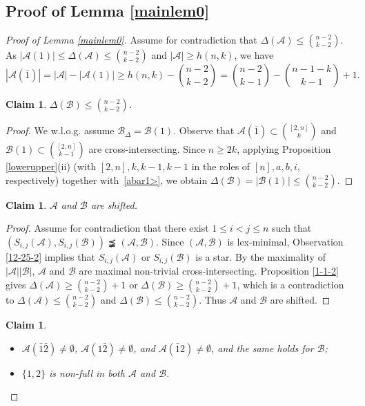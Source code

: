 \documentclass[a4paper,11pt]{article}
\newtheorem{claim}[theorem]{Claim}
\newcommand{\m}{\mathcal}
\begin{document}
\subsection{Proof of Lemma \ref{mainlem0}}
\begin{proof}[Proof of Lemma \ref{mainlem0}]
Assume for contradiction that $\Delta(\mathcal{A})\le {n-2\choose k-2}$. 
As $|\m A(1)|\le \Delta(\m A)\le {n-2\choose k-2}$ and $|\m A|\ge h(n,k)$, 
we have 
\begin{equation}\label{abar1>}
    |\m A(\bar{1})|=|\m A|-|\m A(1)|\ge h(n,k)-{n-2\choose k-2}= {n-2\choose k-1}-{n-1-k\choose k-1}+1.
\end{equation}

\begin{claim}
    $\Delta(\m B)\le {n-2\choose k-2}$.
\end{claim}

\begin{proof}
We w.l.o.g. assume $\m B_{\Delta}=\m B(1)$. 
Observe that $\m A(\bar{1})\subset {[2,n]\choose k}$ and $\m B(1)\subset {[2,n]\choose k-1}$ are cross-intersecting. Since $n\ge 2k$, 
applying Proposition \ref{lowerupper}(ii) (with $[2,n], k, k-1, k-1$ in the roles of $[n], a, b, i$, respectively) together with~\eqref{abar1>}, we obtain 
$\Delta(\m B)=|\m B(1)|\le {n-2\choose k-2}.$ 
\end{proof}

\begin{claim}\label{abshifted}
    $\mathcal{A}$ and $\mathcal{B}$ are shifted.
\end{claim}

\begin{proof}
Assume for contradiction that there exist $1\le i <j \le n$ such that $(S_{i,j}(\mathcal{A}), S_{i,j}(\mathcal{B}))\precneqq(\mathcal{A}, \mathcal{B})$. 
Since $(\m A, \m B)$ is lex-minimal, Observation \ref{12-25-2} implies that $S_{i,j}(\mathcal{A})$ or $S_{i,j}(\mathcal{B})$ is a star. 
By the maximality of $|\m A||\m B|$, $\m A$ and $\m B$ are maximal non-trivial cross-intersecting. 
 Proposition \ref{1-1-2} gives  
$\Delta(\mathcal{A})\ge {n-2\choose k-2}+1$ or $\Delta(\m B)\ge {n-2\choose k-2}+1$, which is a contradiction to $\Delta(\mathcal{A})\le {n-2\choose k-2}$ and $\Delta(\m B)\le {n-2\choose k-2}$. Thus $\mathcal{A}$ and $\mathcal{B}$ are shifted.
\end{proof} 

\begin{claim}\label{12nonfull}
    \begin{itemize}
    \item[(i)] 
    $\m A(\bar1\bar2)\ne \emptyset$, $\m A(1\bar2)\ne \emptyset$, and $\m A(\bar1 2)\ne \emptyset$, and the same holds for $\m B$;
    \item[(ii)] 
    $\{1,2\}$ is non-full in both $\m A$ and $\m B$.
    \end{itemize}
\end{claim}


\end{proof}
\end{document}
